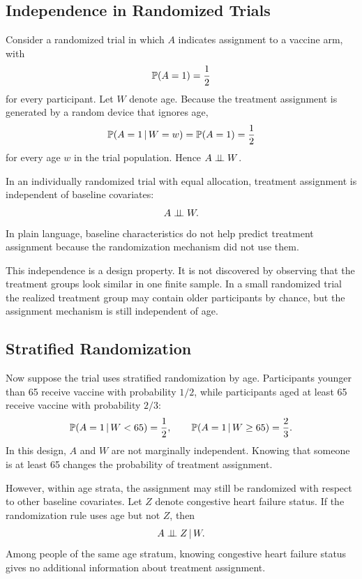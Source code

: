 \subsection{Independence in Randomized Trials}

Consider a randomized trial in which $A$ indicates assignment to a vaccine arm, with
\[
\mathbb{P}(A=1)=\frac{1}{2}
\]
for every participant. Let $W$ denote age. Because the treatment assignment is generated by a random device that ignores age,
\[
\mathbb{P}(A=1\,\vert\, W=w)=\mathbb{P}(A=1)=\frac{1}{2}
\]
for every age $w$ in the trial population. Hence $A\perp\!\!\!\perp W$.

\begin{assumptionbox}
In an individually randomized trial with equal allocation, treatment assignment is independent of baseline covariates:
\[
A\perp\!\!\!\perp W.
\]
In plain language, baseline characteristics do not help predict treatment assignment because the randomization mechanism did not use them.
\end{assumptionbox}

This independence is a design property. It is not discovered by observing that the treatment groups look similar in one finite sample. In a small randomized trial the realized treatment group may contain older participants by chance, but the assignment mechanism is still independent of age.

\subsection{Stratified Randomization}

Now suppose the trial uses stratified randomization by age. Participants younger than 65 receive vaccine with probability $1/2$, while participants aged at least 65 receive vaccine with probability $2/3$:
\[
\mathbb{P}(A=1\,\vert\, W<65)=\frac{1}{2},
\qquad
\mathbb{P}(A=1\,\vert\, W\ge 65)=\frac{2}{3}.
\]
In this design, $A$ and $W$ are not marginally independent. Knowing that someone is at least 65 changes the probability of treatment assignment.

However, within age strata, the assignment may still be randomized with respect to other baseline covariates. Let $Z$ denote congestive heart failure status. If the randomization rule uses age but not $Z$, then
\[
A\perp\!\!\!\perp Z\,\vert\, W.
\]
Among people of the same age stratum, knowing congestive heart failure status gives no additional information about treatment assignment.

